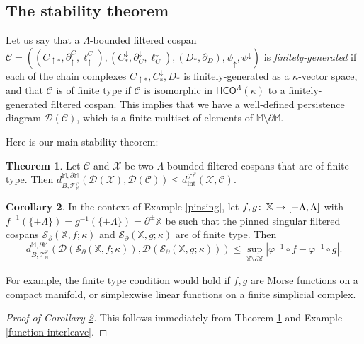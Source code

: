 \documentclass[11pt]{amsart}
\theoremstyle{definition}
\newtheorem{theorem}{Theorem}[section]
\newtheorem{cor}[theorem]{Corollary}
\theoremstyle{remark}
\numberwithin{equation}{section}
\def\co{\colon\thinspace}
\begin{document}
\subsection{The stability theorem}

Let us say that a $\Lambda$-bounded filtered cospan \\ $\mathcal{C}=\left((C_{\uparrow *},\partial_{\uparrow}^C,\ell_{\uparrow}^C),(C^{\downarrow}_{*},\partial^{\downarrow}_C,\ell^{\downarrow}_C),(D_*,\partial_D),\psi_{\uparrow},\psi^{\downarrow}\right)$ is \emph{finitely-generated} if each of the chain complexes $C_{\uparrow *},C^{\downarrow}_{*},D_*$ is finitely-generated as a $\kappa$-vector space, and that $\mathcal{C}$ is of finite type if $\mathcal{C}$ is isomorphic in $\mathsf{HCO}^{\Lambda}(\kappa)$ to a finitely-generated filtered cospan.  This implies that we have a well-defined persistence diagram $\mathcal{D}(\mathcal{C})$, which is a finite multiset of elements of $\mathbb{M}\setminus\partial\mathbb{M}$.

Here is our main stability theorem:

\begin{theorem}\label{mainstab}
	Let $\mathcal{C}$ and $\mathcal{X}$ be two $\Lambda$-bounded filtered cospans that are of finite type.  Then $d_{B,\mathcal{T}_{\mathbb{M}}^{\varphi}}^{\mathbb{M},\partial\mathbb{M}}(\mathcal{D}(\mathcal{X}),\mathcal{D}(\mathcal{C}))\leq d_{\mathrm{int}}^{\mathcal{T}^{\varphi}}(\mathcal{X},\mathcal{C})$.
\end{theorem} 



\begin{cor}\label{fnstable} In the context of Example \ref{pinsing},
	let $f,g\co\mathbb{X}\to  [-\Lambda,\Lambda]$ with $f^{-1}(\{\pm\Lambda\})=g^{-1}(\{\pm\Lambda\})=\partial^{\pm}\mathbb{X}$ be such that the pinned singular filtered cospans $\mathcal{S}_{\partial}(\mathbb{X},f;\kappa)$ and $\mathcal{S}_{\partial}(\mathbb{X},g;\kappa)$ are of finite type.  Then \[ d_{B,\mathcal{T}_{\mathbb{M}}^{\varphi}}^{\mathbb{M},\partial\mathbb{M}}\left(\mathcal{D}(\mathcal{S}_{\partial}(\mathbb{X},f;\kappa)),\mathcal{D}(\mathcal{S}_{\partial}(\mathbb{X},g;\kappa))\right)\leq \sup_{\mathbb{X}\setminus\partial\mathbb{X}}\left|\varphi^{-1}\circ f-\varphi^{-1}\circ g\right|. \]
\end{cor}
For example, the finite type condition would hold if $f,g$ are Morse functions on a compact manifold, or simplexwise linear functions on a finite simplicial complex.
\begin{proof}[Proof of Corollary \ref{fnstable}] This follows immediately from Theorem \ref{mainstab} and Example \ref{function-interleave}.\end{proof}
\end{document}
